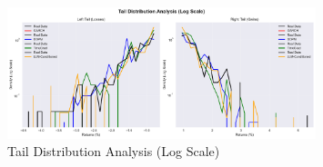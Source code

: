 \begin{figure}[htbp]
\centering
\includegraphics[width=0.8\textwidth]{figures/tail_distribution_analysis.pdf}
\caption{Tail Distribution Analysis (Log Scale)}
\label{fig:taildistributionanalysis}
\end{figure}